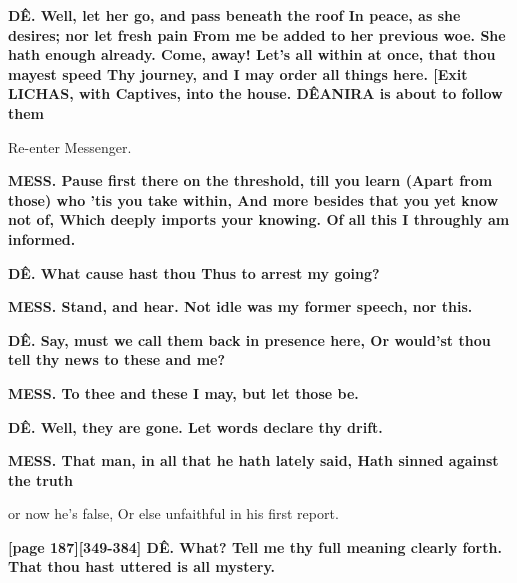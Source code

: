 \documentclass[11pt,letter]{book}
\begin{document}
\par \textbf{DÊ. Well, let her go, and pass beneath the roof In peace, as she desires; nor let fresh pain From me be added to her previous woe. She hath enough already. Come, away! Let’s all within at once, that thou mayest speed Thy journey, and I may order all things here. [Exit LICHAS, with Captives, into the house. DÊANIRA is about to follow them}
\par 

\par  Re-enter Messenger.

\par \textbf{MESS. Pause first there on the threshold, till you learn (Apart from those) who ’tis you take within, And more besides that you yet know not of, Which deeply imports your knowing. Of all this I throughly am informed.}
\par 

\par \textbf{DÊ. What cause hast thou Thus to arrest my going?}
\par 

\par \textbf{MESS. Stand, and hear. Not idle was my former speech, nor this.}
\par 

\par \textbf{DÊ. Say, must we call them back in presence here, Or would’st thou tell thy news to these and me?}
\par 

\par \textbf{MESS. To thee and these I may, but let those be.}
\par 

\par \textbf{DÊ. Well, they are gone. Let words declare thy drift.}
\par 

\par \textbf{MESS. That man, in all that he hath lately said, Hath sinned against the truth}
\par   or now he’s false, Or else unfaithful in his first report.

\par \textbf{[page 187][349-384] DÊ. What? Tell me thy full meaning clearly forth. That thou hast uttered is all mystery.}
\par 
\end{document}
